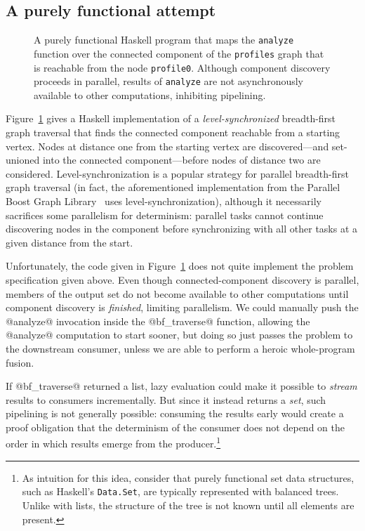 \subsection{A purely functional attempt}

\begin{figure}
  
  \caption{A purely functional Haskell program that maps the
    \lstinline|analyze| function over the connected component of the
    \lstinline|profiles| graph that is reachable from the node
    \lstinline|profile0|.  Although component discovery proceeds in
    parallel, results of \lstinline|analyze| are not asynchronously
    available to other computations, inhibiting pipelining.}
  \label{f:bfs-pure}
\end{figure}

Figure~\ref{f:bfs-pure} gives a Haskell implementation of a
\emph{level-synchronized} breadth-first graph traversal that finds the
connected component reachable from a starting vertex.  Nodes at
distance one from the starting vertex are discovered---and set-unioned
into the connected component---before nodes of distance two are
considered.  Level-synchronization is a popular strategy for parallel
breadth-first graph traversal (in fact, the aforementioned
implementation from the Parallel Boost Graph Library~\cite{bfs-pbgl}
uses level-synchronization), although it necessarily sacrifices some
parallelism for determinism: parallel tasks cannot continue
discovering nodes in the component before synchronizing with all other
tasks at a given distance from the start.

Unfortunately, the code given in Figure~\ref{f:bfs-pure} does not
quite implement the problem specification given above.  Even though
connected-component discovery is parallel, members of the output set
do not become available to other computations until component
discovery is \emph{finished}, limiting parallelism.  We could
manually push the @analyze@ invocation inside the @bf_traverse@
function, allowing the @analyze@ computation to start sooner, but
doing so just passes the problem to the downstream consumer, unless
we are able to perform a heroic whole-program fusion.

If @bf_traverse@ returned a list, lazy evaluation could make it
possible to \emph{stream} results to consumers incrementally.  But
since it instead returns a \emph{set}, such pipelining is not
generally possible: consuming the results early would create a proof
obligation that the determinism of the consumer does not depend on the
order in which results emerge from the producer.\footnote{As intuition
  for this idea, consider that purely functional set data structures,
  such as Haskell's \lstinline|Data.Set|, are typically represented
  with balanced trees.  Unlike with lists, the structure of the tree
  is not known until all elements are present.}

